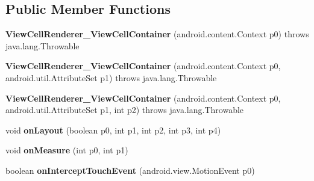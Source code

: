 \subsection*{Public Member Functions}
\begin{DoxyCompactItemize}
\item 
\hypertarget{classmd5282f1122c1313907b9bf274dd2c2f344_1_1ViewCellRenderer__ViewCellContainer_aa0712ef86e3cac77b7ac01b2112c15d2}{}{\bfseries View\+Cell\+Renderer\+\_\+\+View\+Cell\+Container} (android.\+content.\+Context p0)  throws java.\+lang.\+Throwable 	\label{classmd5282f1122c1313907b9bf274dd2c2f344_1_1ViewCellRenderer__ViewCellContainer_aa0712ef86e3cac77b7ac01b2112c15d2}

\item 
\hypertarget{classmd5282f1122c1313907b9bf274dd2c2f344_1_1ViewCellRenderer__ViewCellContainer_a8715b357bde9077984f18961304f1533}{}{\bfseries View\+Cell\+Renderer\+\_\+\+View\+Cell\+Container} (android.\+content.\+Context p0, android.\+util.\+Attribute\+Set p1)  throws java.\+lang.\+Throwable 	\label{classmd5282f1122c1313907b9bf274dd2c2f344_1_1ViewCellRenderer__ViewCellContainer_a8715b357bde9077984f18961304f1533}

\item 
\hypertarget{classmd5282f1122c1313907b9bf274dd2c2f344_1_1ViewCellRenderer__ViewCellContainer_ad941e4c0ecbd392c2d3d8b3f47eeb058}{}{\bfseries View\+Cell\+Renderer\+\_\+\+View\+Cell\+Container} (android.\+content.\+Context p0, android.\+util.\+Attribute\+Set p1, int p2)  throws java.\+lang.\+Throwable 	\label{classmd5282f1122c1313907b9bf274dd2c2f344_1_1ViewCellRenderer__ViewCellContainer_ad941e4c0ecbd392c2d3d8b3f47eeb058}

\item 
\hypertarget{classmd5282f1122c1313907b9bf274dd2c2f344_1_1ViewCellRenderer__ViewCellContainer_a97d7c448ad240d90b92584f585d933a3}{}void {\bfseries on\+Layout} (boolean p0, int p1, int p2, int p3, int p4)\label{classmd5282f1122c1313907b9bf274dd2c2f344_1_1ViewCellRenderer__ViewCellContainer_a97d7c448ad240d90b92584f585d933a3}

\item 
\hypertarget{classmd5282f1122c1313907b9bf274dd2c2f344_1_1ViewCellRenderer__ViewCellContainer_a057048b165c61b828abed2cab35d7a8e}{}void {\bfseries on\+Measure} (int p0, int p1)\label{classmd5282f1122c1313907b9bf274dd2c2f344_1_1ViewCellRenderer__ViewCellContainer_a057048b165c61b828abed2cab35d7a8e}

\item 
\hypertarget{classmd5282f1122c1313907b9bf274dd2c2f344_1_1ViewCellRenderer__ViewCellContainer_ae6361551380571d965bff281feda99fb}{}boolean {\bfseries on\+Intercept\+Touch\+Event} (android.\+view.\+Motion\+Event p0)\label{classmd5282f1122c1313907b9bf274dd2c2f344_1_1ViewCellRenderer__ViewCellContainer_ae6361551380571d965bff281feda99fb}


\end{DoxyCompactItemize}
